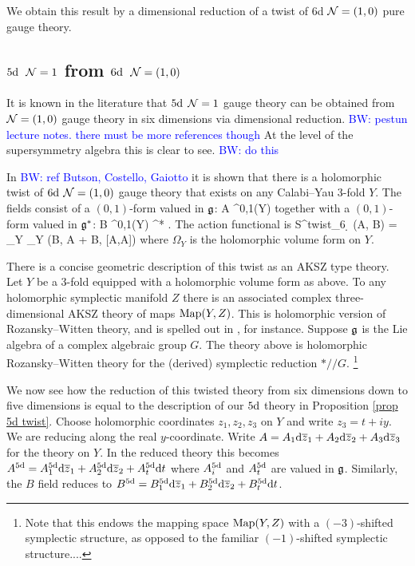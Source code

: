 \documentclass[10pt]{amsart}
\def\brian{\textcolor{blue}{BW: }\textcolor{blue}}
\begin{document}
We obtain this result by a dimensional reduction of a twist of 6d $\mathcal N = (1,0)$ pure gauge theory. 

\subsection{$5{\rm d}$ $\mathcal N=1$ from $6{\rm d}$ $\mathcal N=(1,0)$}

It is known in the literature that $5{\rm d}$ $\mathcal N=1$ gauge theory can be obtained from $\mathcal N=(1,0)$ gauge theory in six dimensions via dimensional reduction. \brian{pestun lecture notes. there must be more references though}
At the level of the supersymmetry algebra this is clear to see. \brian{do this} 

In \brian{ref Butson, Costello, Gaiotto} it is shown that there is a holomorphic twist of $6{\rm d}$ $\mathcal N=(1,0)$ gauge theory that exists on any Calabi--Yau 3-fold $Y$.
The fields consist of a $(0,1)$-form valued in $\mathfrak g$:
\ben
A \in \Omega^{0,1}(Y) \tensor \fg
\een
together with a $(0,1)$-form valued in $\mathfrak g^*$:
\ben
B \in \Omega^{0,1}(Y) \tensor \fg^* .
\een
The action functional is
\ben
S^{twist}_{6 \d} (A, B) = \int_Y \Omega_Y \left(\<B, \dbar A\> + \<B, [A,A]\>\right)
\een
where $\Omega_Y$ is the holomorphic volume form on $Y$. 
 
\begin{rmk}
There is a concise geometric description of this twist as an AKSZ type theory.
Let $Y$ be a $3$-fold equipped with a holomorphic volume form as above.
To any holomorphic symplectic manifold $Z$ there is an associated complex three-dimensional AKSZ theory of maps ${\rm Map}(Y,Z)$.
This is holomorphic version of Rozansky--Witten theory, and is spelled out in \cite{QZ}, for instance.
Suppose $\mathfrak g$ is the Lie algebra of a complex algebraic group $G$. 
The theory above is holomorphic Rozansky--Witten theory for the (derived) symplectic reduction $* // G$. \footnote{Note that this endows the mapping space ${\rm Map}(Y,Z)$ with a $(-3)$-shifted symplectic structure, as opposed to the familiar $(-1)$-shifted symplectic structure....}
\end{rmk}

We now see how the reduction of this twisted theory from six dimensions down to five dimensions is equal to the description of our $5{\rm d}$ theory in Proposition \ref{prop 5d twist}. 
Choose holomorphic coordinates $z_1, z_2, z_3$ on $Y$ and write $z_3 = t + i y$. 
We are reducing along the real $y$-coordinate. 
Write $A = A_1 {\rm d} \overline{z}_1 + A_2 {\rm d} \overline{z}_2 + A_3 {\rm d} \overline{z}_3$ for the theory on $Y$.
In the reduced theory this becomes $A^{5 {\rm d}} = A^{5 {\rm d}}_1 {\rm d} \overline{z}_1 + A^{5 {\rm d}}_2 {\rm d} \overline{z}_2 + A^{5 {\rm d}}_t {\rm d} t$ where $A_i^{5 {\rm d}}$ and $A_{t}^{5 {\rm d}}$ are valued in $\mathfrak g$. 
Similarly, the $B$ field reduces to $B^{5 {\rm d}} = B^{5 {\rm d}}_1 {\rm d} \overline{z}_1 + B^{5 {\rm d}}_2 {\rm d} \overline{z}_2 + B^{5 {\rm d}}_t {\rm d} t$. 
\end{document}
